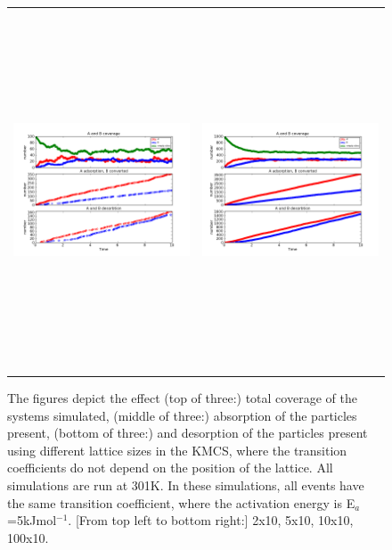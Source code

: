 \documentclass[11pt]{article}
\begin{document}
\begin{figure}[h!]
\begin{tabular}{cc}
\includegraphics[width=3.5in, height=4.2in]{./coadsorb_irreversible/AtoBirreversible10x10_301_allsamek_A5_EA5E3_3.png} &
\includegraphics[width=3.5in, height=4.2in]{./coadsorb_irreversible/AtoBirreversible100x10_301_allsamek_A5_EA5E3_3.png} 
\end{tabular}
\caption{The figures depict the effect (top of three:) total coverage of the systems simulated, (middle of three:) absorption of the particles present, (bottom of three:) and desorption of the particles present using different lattice sizes in the KMCS, where the transition coefficients do not depend on the position of the lattice. All simulations are run at 301K. In these simulations, all events have the same transition coefficient, where the activation energy is E$_a$=5kJmol$^{-1}$. [From top left to bottom right:] 2x10, 5x10, 10x10, 100x10. }
\end{figure}
\end{document}
